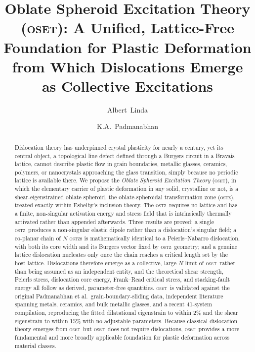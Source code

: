 \documentclass[5p,sort&compress]{elsarticle}
\newcommand{\OSTZ}{\textsc{ostz}}
\newcommand{\OSET}{\textsc{oset}}
\begin{document}
\begin{frontmatter}

\title{Oblate Spheroid Excitation Theory (\OSET): A Unified,
  Lattice-Free Foundation for Plastic Deformation from Which
  Dislocations Emerge as Collective Excitations}

\author[iitk]{Albert~Linda}
\author[anna]{K.A.~Padmanabhan}


\begin{abstract}
Dislocation theory has underpinned crystal plasticity for nearly a
century, yet its central object, a topological line defect defined
through a Burgers circuit in a Bravais lattice, cannot describe
plastic flow in grain boundaries, metallic glasses, ceramics,
polymers, or nanocrystals approaching the glass transition, simply
because no periodic lattice is available there. We propose the
\emph{Oblate Spheroid Excitation Theory} (\OSET), in which the
elementary carrier of plastic deformation in any solid, crystalline
or not, is a shear-eigenstrained oblate spheroid, the
oblate-spheroidal transformation zone (\OSTZ), treated exactly within
Eshelby's inclusion theory. The \OSTZ\ requires no lattice and has a
finite, non-singular activation energy and stress field that is
intrinsically thermally activated rather than appended afterwards.
Three results are proved: a single \OSTZ\ produces a non-singular
elastic dipole rather than a dislocation's singular field; a
co-planar chain of $N$ \OSTZ s is mathematically identical to a
Peierls--Nabarro dislocation, with both its core width and its
Burgers vector fixed by \OSTZ\ geometry; and a genuine lattice
dislocation nucleates only once the chain reaches a critical length
set by the host lattice. Dislocations therefore emerge as a
collective, large-$N$ limit of \OSET\ rather than being assumed as an
independent entity, and the theoretical shear strength, Peierls
stress, dislocation core energy, Frank--Read critical stress, and
stacking-fault energy all follow as derived, parameter-free
quantities. \OSET\ is validated against the original Padmanabhan et
al.\ grain-boundary-sliding data, independent literature spanning
metals, ceramics, and bulk metallic glasses, and a recent 41-system
compilation, reproducing the fitted dilatational eigenstrain to
within 2\% and the shear eigenstrain to within 15\% with no
adjustable parameters. Because classical dislocation theory emerges
from \OSET\ but \OSET\ does not require dislocations, \OSET\
provides a more fundamental and more broadly applicable foundation
for plastic deformation across material classes.
\end{abstract}


\end{frontmatter}
\end{document}
